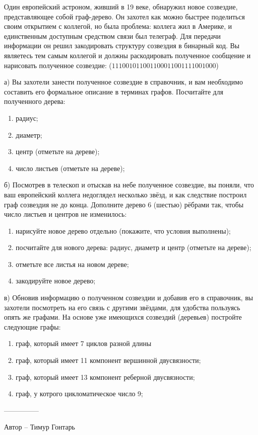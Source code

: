 \question
Один европейский астроном, живший в 19 веке, обнаружил новое созвездие, представляющее собой граф-дерево. Он захотел как можно быстрее поделиться своим открытием с коллегой, но была проблема: коллега жил в Америке, и единственным доступным средством связи был телеграф. Для передачи информации он решил закодировать структуру созвездия в бинарный код. Вы являетесь тем самым коллегой и должны раскодировать полученное сообщение и нарисовать полученное созвездие: ($111001011001100011001111001000$)

а) Вы захотели занести полученное созвездие в справочник, и вам необходимо составить его формальное описание в терминах графов. Посчитайте для полученного дерева:
\begin{enumerate}
\item радиус;
\item диаметр;
\item центр (отметьте на дереве);
\item число листьев (отметьте на дереве);
\end{enumerate}

б) Посмотрев в телескоп и отыскав на небе полученное созвездие, вы поняли, что ваш европейский коллега недоглядел несколько звёзд, и как следствие построил граф созвездия не до конца. Дополните дерево 6 (шестью) рёбрами так, чтобы число листьев и центров не изменилось:
\begin{enumerate}
\item нарисуйте новое дерево отдельно (покажите, что условия выполнены);
\item посчитайте для нового дерева: радиус, диаметр и центр (отметьте на дереве);
\item отметьте все листья на новом дереве;
\item закодируйте новое дерево;
\end{enumerate}

в) Обновив информацию о полученном созвездии и добавив его в справочник, вы захотели посмотреть на его связь с другими звёздами, для удобства пользуясь опять же графами. На основе уже имеющихся созвездий (деревьев) постройте следующие графы:
\begin{enumerate}
\item граф, который имеет 7 циклов разной длины
\item граф, который имеет 11 компонент вершинной двусвязности;
\item граф, который имеет 13 компонент реберной двусвязности;
\item граф, у котрого цикломатическое число 9;
\end{enumerate}

---------------

Автор -- Тимур Гонтарь
